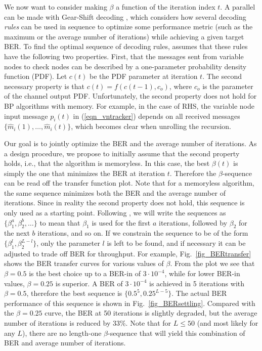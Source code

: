 \documentclass[12pt,journal,twoside,draftcls,onecolumn]{IEEEtran}
\begin{document}
	
We now want to consider making $\beta$ a function of the iteration index $t$. A parallel can be made with Gear-Shift decoding \cite{ardakani:2006}, which considers how several decoding \emph{rules} can be used in sequence to optimize some performance metric (such as the maximum or the average number of iterations) while achieving a given target BER.
To find the optimal sequence of decoding rules, \cite{ardakani:2006} assumes that these rules have the following two properties. First, that the messages sent from variable nodes to check nodes can be described by a one-parameter probability density function (PDF). Let $c(t)$ be the PDF parameter at iteration $t$. The second necessary property is that $c(t) = f\left( c(t-1), c_o \right)$, where $c_o$ is the parameter of the channel output PDF.
Unfortunately, the second property does not hold for BP algorithms with memory. For example, in the case of RHS, the variable node input message $p_i(t)$ in (\ref{eqn_vntracker}) depends on all received messages $\{\hat{m}_i(1), \ldots, \hat{m}_i(t)\}$, which becomes clear when unrolling the recursion.

Our goal is to jointly optimize the BER and the average number of iterations.
As a design procedure, we propose to initially assume that the second property holds, i.e., that the algorithm is memoryless. 
In this case, the best $\beta(t)$ is simply the one that minimizes the BER at iteration $t$. Therefore the $\beta$-sequence can be read off the transfer function plot. Note that for a memoryless algorithm, the same sequence minimizes both the BER and the average number of iterations.
Since in reality the second property does not hold, this sequence is only used as a starting point. Following \cite{ardakani:2006}, we will write the sequences as $\{\beta_1^a, \beta_2^b, \ldots\}$ to mean that $\beta_1$ is used for the first $a$ iterations, followed by $\beta_2$ for the next $b$ iterations, and so on. If we constrain the sequence to be of the form $\{\beta_1^l, \beta_2^{L-l}\}$, only the parameter $l$ is left to be found, and if necessary it can be adjusted to trade off BER for throughput.
For example, Fig.~\ref{fig_BERtransfer} shows the BER transfer curves for various values of $\beta$. From the plot we see that $\beta=0.5$ is the best choice up to a BER-in of $3 \cdot 10^{-4}$, while for lower BER-in values, $\beta=0.25$ is superior. A BER of $3 \cdot 10^{-4}$ is achieved in 5 iterations with $\beta=0.5$, therefore the best sequence is $\{0.5^5, 0.25^{L-5}\}$. The actual BER performance of this sequence is shown in Fig.~\ref{fig_BERsettling}. Compared with the $\beta=0.25$ curve, the BER at 50 iterations is slightly degraded, but the average number of iterations is reduced by 33\%.
Note that for $L \leq 50$ (and most likely for any $L$), there are no length-one $\beta$-sequence that will yield this combination of BER and average number of iterations.
\end{document}
